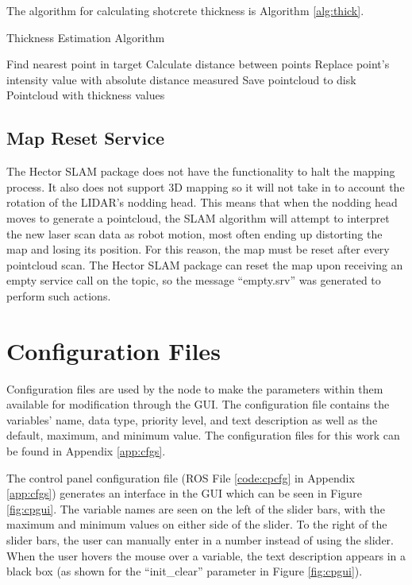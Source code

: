 The algorithm for calculating shotcrete thickness is Algorithm \ref{alg:thick}.

\begin{algorithm}[H]
\caption{Thickness Estimation Algorithm}
\label{alg:thick}
\begin{algorithmic}[1]
\begin{raggedright}
\State Find nearest point in target
\State Calculate distance between points
\State Replace point's intensity value with absolute distance measured
\EndFor
\State Save pointcloud to disk
\EndFunction\\
\Return Pointcloud with thickness values
\end{raggedright}
\end{algorithmic}
\end{algorithm}

\subsection{Map Reset Service}
The Hector SLAM package does not have the functionality to halt the mapping process. It also does not support 3D mapping so it will not take in to account the rotation of the LIDAR's nodding head. This means that when the nodding head moves to generate a pointcloud, the SLAM algorithm will attempt to interpret the new laser scan data as robot motion, most often ending up distorting the map and losing its position. For this reason, the map must be reset after every pointcloud scan. The Hector SLAM package can reset the map upon receiving an empty service call on the  topic, so the message ``empty.srv'' was generated to perform such actions.\\

\section{Configuration Files}
Configuration files are used by the  node to make the parameters within them available for modification through the  GUI. The configuration file contains the variables' name, data type, priority level, and text description as well as the default, maximum, and minimum value. The configuration files for this work can be found in Appendix \ref{app:cfgs}.

The control panel configuration file (ROS File \ref{code:cpcfg} in Appendix \ref{app:cfgs}) generates an interface in the  GUI which can be seen in Figure \ref{fig:cpgui}. The variable names are seen on the left of the slider bars, with the maximum and minimum values on either side of the slider. To the right of the slider bars, the user can manually enter in a number instead of using the slider. When the user hovers the mouse over a variable, the text description appears in a black box (as shown for the ``init\_clear'' parameter in Figure \ref{fig:cpgui}).

